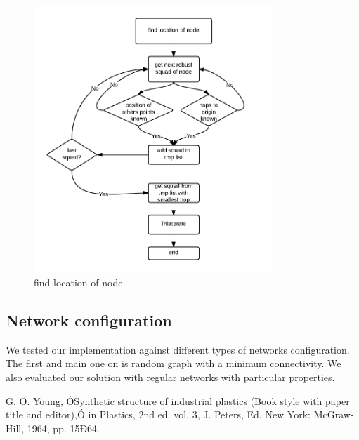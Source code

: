 \documentclass[letterpaper, 10 pt, conference]{ieeeconf}  %
\begin{document}
\begin{figure}[ht!]
\centering
\includegraphics[width=90mm]{find_location.png}
\caption{find location of node}
\label{overflow}
\end{figure}

\subsection{Network configuration}
We tested our implementation against different types of networks configuration. The first and main one on is random graph with a minimum connectivity.
We also evaluated our solution with regular networks with particular properties.




\begin{thebibliography}{99}

 G. O. Young, ÒSynthetic structure of industrial plastics (Book style with paper title and editor),Ó 	in Plastics, 2nd ed. vol. 3, J. Peters, Ed.  New York: McGraw-Hill, 1964, pp. 15Ð64.




\end{thebibliography}
\end{document}
